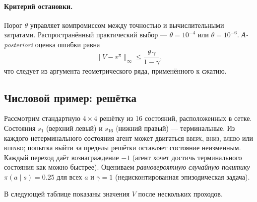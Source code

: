 \paragraph{Критерий остановки.}
Порог $\theta$ управляет компромиссом между точностью и вычислительными затратами.  Распространённый практический выбор — $\theta = 10^{-4}$ или $\theta = 10^{-6}$.  \emph{А-posteriori} оценка ошибки равна
\[
\|V - v^\pi\|_\infty \le \frac{\theta\,\gamma}{1-\gamma},
\]
что следует из аргумента геометрического ряда, применённого к сжатию.

\subsection*{Числовой пример: решётка}

\begin{example}
\label{ex:gridworld-eval}
Рассмотрим стандартную $4\times4$ решётку из 16 состояний, расположенных в сетке.  Состояния $s_1$ (верхний левый) и $s_{16}$ (нижний правый) — терминальные.  Из каждого нетерминального состояния агент может двигаться \textsc{вверх}, \textsc{вниз}, \textsc{влево} или \textsc{вправо}; попытка выйти за пределы решётки оставляет состояние неизменным.  Каждый переход даёт вознаграждение $-1$ (агент хочет достичь терминального состояния как можно быстрее).  Оцениваем \emph{равновероятную случайную политику} $\pi(a \mid s) = 0.25$ для всех $a$ и $\gamma = 1$ (недисконтированная эпизодическая задача).

\medskip
\noindent
В следующей таблице показаны значения $V$ после нескольких проходов.


\end{example}
